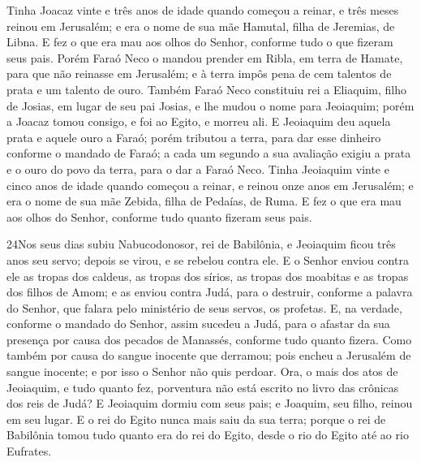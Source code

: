 Tinha Joacaz vinte e três anos de idade quando começou a reinar,
e três meses reinou em Jerusalém; e era o nome de sua mãe Hamutal,
filha de Jeremias, de Libna. E fez o que era mau aos olhos do
Senhor, conforme tudo o que fizeram seus pais. Porém Faraó
Neco o mandou prender em Ribla, em terra de Hamate, para que não
reinasse em Jerusalém; e à terra impôs pena de cem talentos de prata
e um talento de ouro. Também Faraó Neco constituiu rei a
Eliaquim, filho de Josias, em lugar de seu pai Josias, e lhe mudou o
nome para Jeoiaquim; porém a Joacaz tomou consigo, e foi ao Egito, e
morreu ali. E Jeoiaquim deu aquela prata e aquele ouro a
Faraó; porém tributou a terra, para dar esse dinheiro conforme o
mandado de Faraó; a cada um segundo a sua avaliação exigiu a prata e
o ouro do povo da terra, para o dar a Faraó Neco. Tinha
Jeoiaquim vinte e cinco anos de idade quando começou a reinar, e
reinou onze anos em Jerusalém; e era o nome de sua mãe Zebida, filha
de Pedaías, de Ruma. E fez o que era mau aos olhos do Senhor,
conforme tudo quanto fizeram seus pais.

\medskip

\lettrine{24} Nos seus dias subiu Nabucodonosor, rei de
Babilônia, e Jeoiaquim ficou três anos seu servo; depois se virou, e
se rebelou contra ele. E o Senhor enviou contra ele as tropas
dos caldeus, as tropas dos sírios, as tropas dos moabitas e as
tropas dos filhos de Amom; e as enviou contra Judá, para o destruir,
conforme a palavra do Senhor, que falara pelo ministério de seus
servos, os profetas. E, na verdade, conforme o mandado do
Senhor, assim sucedeu a Judá, para o afastar da sua presença por
causa dos pecados de Manassés, conforme tudo quanto fizera. Como
também por causa do sangue inocente que derramou; pois encheu a
Jerusalém de sangue inocente; e por isso o Senhor não quis perdoar.
Ora, o mais dos atos de Jeoiaquim, e tudo quanto fez, porventura
não está escrito no livro das crônicas dos reis de Judá? E
Jeoiaquim dormiu com seus pais; e Joaquim, seu filho, reinou em seu
lugar. E o rei do Egito nunca mais saiu da sua terra; porque o
rei de Babilônia tomou tudo quanto era do rei do Egito, desde o rio
do Egito até ao rio Eufrates.

